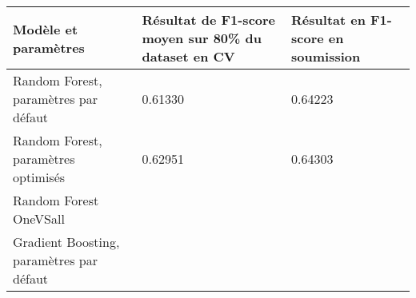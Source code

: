 \documentclass[11pt]{article}
\begin{document}
\begin{longtable}[]{@{}lll@{}}
\toprule
\begin{minipage}[b]{0.32\columnwidth}\raggedright\strut
Modèle et paramètres\strut
\end{minipage} & \begin{minipage}[b]{0.26\columnwidth}\raggedright\strut
Résultat de F1-score moyen sur 80\% du dataset en CV\strut
\end{minipage} & \begin{minipage}[b]{0.32\columnwidth}\raggedright\strut
Résultat en F1-score en soumission\strut
\end{minipage}\tabularnewline
\midrule
\endhead
\begin{minipage}[t]{0.32\columnwidth}\raggedright\strut
Random Forest, paramètres par défaut\strut
\end{minipage} & \begin{minipage}[t]{0.26\columnwidth}\raggedright\strut
0.61330\strut
\end{minipage} & \begin{minipage}[t]{0.32\columnwidth}\raggedright\strut
0.64223\strut
\end{minipage}\tabularnewline
\begin{minipage}[t]{0.32\columnwidth}\raggedright\strut
Random Forest, paramètres optimisés\strut
\end{minipage} & \begin{minipage}[t]{0.26\columnwidth}\raggedright\strut
0.62951\strut
\end{minipage} & \begin{minipage}[t]{0.32\columnwidth}\raggedright\strut
0.64303\strut
\end{minipage}\tabularnewline
\begin{minipage}[t]{0.32\columnwidth}\raggedright\strut
Random Forest OneVSall\strut
\end{minipage} & \begin{minipage}[t]{0.26\columnwidth}\raggedright\strut
\strut
\end{minipage} & \begin{minipage}[t]{0.32\columnwidth}\raggedright\strut
\strut
\end{minipage}\tabularnewline
\begin{minipage}[t]{0.32\columnwidth}\raggedright\strut
Gradient Boosting, paramètres par défaut\strut
\end{minipage} & \begin{minipage}[t]{0.26\columnwidth}\raggedright\strut
\strut

\end{minipage}
\end{longtable}
\end{document}
